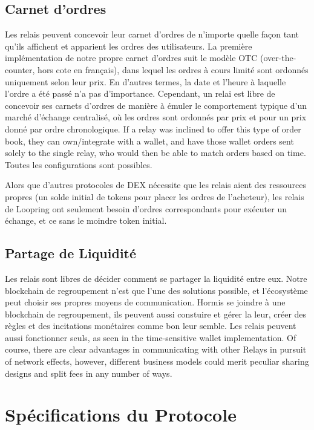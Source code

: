\documentclass[UTF8,nofonts]{article}
\begin{document}
\begin{multicols}{2}
\subsection{Carnet d'ordres\label{sec:order_book}}
Les relais peuvent concevoir leur carnet d'ordres de n'importe quelle façon tant qu'ils affichent et apparient les ordres des utilisateurs. La première implémentation de notre propre carnet d'ordres suit le modèle OTC (over-the-counter, hors cote en français), dans lequel les ordres à cours limité sont ordonnés uniquement selon leur prix. En d'autres termes, la date et l'heure à laquelle l'ordre a été passé n'a pas d'importance. Cependant, un relai est libre de concevoir ses carnets d'ordres de manière à émuler le comportement typique d'un marché d'échange centralisé, où les ordres sont ordonnés par prix et pour un prix donné par ordre chronologique. If a relay was inclined to offer this type of order book, they can own/integrate with a wallet, and have those wallet orders sent solely to the single relay, who would then be able to match orders based on time. Toutes les configurations sont possibles.

Alors que d'autres protocoles de DEX nécessite que les relais aient des ressources propres (un solde initial de tokens pour placer les ordres de l'acheteur), les relais de Loopring ont seulement besoin d'ordres correspondants pour exécuter un échange, et ce sans le moindre token initial.

\subsection{Partage de Liquidité\label{sec:liquidity_sharing}}
Les relais sont libres de décider comment se partager la liquidité entre eux. Notre blockchain de regroupement n'est que l'une des solutions possible, et l'écosystème peut choisir ses propres moyens de communication. Hormis se joindre à une blockchain de regroupement, ils peuvent aussi constuire et gérer la leur, créer des règles et des incitations monétaires comme bon leur semble. Les relais peuvent aussi fonctionner seuls, as seen in the time-sensitive wallet implementation. Of course, there are clear advantages in communicating with other Relays in pursuit of network effects, however, different business models could merit peculiar sharing designs and split fees in any number of ways.


\section{Spécifications du Protocole\label{sec:protocol}}


\end{multicols}
\end{document}
